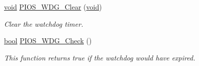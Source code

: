 \begin{DoxyCompactItemize}
\hyperlink{group___n_a_m_e_ga18028b8badbf1ea7e704ccac3c488e82}{void} \hyperlink{group___p_i_o_s___w_d_g_ga49f0e0259a9db3551d437e5d74fd48a1}{P\-I\-O\-S\-\_\-\-W\-D\-G\-\_\-\-Clear} (\hyperlink{group___n_a_m_e_ga18028b8badbf1ea7e704ccac3c488e82}{void})
\begin{DoxyCompactList}\small\item\em Clear the watchdog timer. \end{DoxyCompactList}\item 
\hyperlink{group___exported__types_gaf6a258d8f3ee5206d682d799316314b1}{bool} \hyperlink{group___p_i_o_s___w_d_g_ga99894e8c1d9881ff686f211a619463dd}{P\-I\-O\-S\-\_\-\-W\-D\-G\-\_\-\-Check} ()
\begin{DoxyCompactList}\small\item\em This function returns true if the watchdog would have expired. \end{DoxyCompactList}\end{DoxyCompactItemize}
